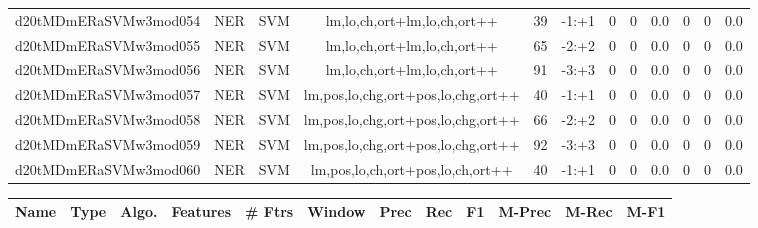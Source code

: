 \documentclass[a4paper]{article}
\begin{document}
\begin{landscape}
\begin{center}
\begin{tabular}{ |c|c|c|c|c|c|c|c|c|c|c|c|}
 
 	
 	\small{ d20tMDmERaSVMw3mod054 } & \small{ NER} & \small{  SVM }  & lm,lo,ch,ort+lm,lo,ch,ort++  &  39 &  \small{  -1:+1 }  &  0 & 0 & 0.0  &  0 & 0 & 0.0 \\
 	

 
 	
 	\small{ d20tMDmERaSVMw3mod055 } & \small{ NER} & \small{  SVM }  & lm,lo,ch,ort+lm,lo,ch,ort++  &  65 &  \small{  -2:+2 }  &  0 & 0 & 0.0  &  0 & 0 & 0.0 \\
 	

 
 	
 	\small{ d20tMDmERaSVMw3mod056 } & \small{ NER} & \small{  SVM }  & lm,lo,ch,ort+lm,lo,ch,ort++  &  91 &  \small{  -3:+3 }  &  0 & 0 & 0.0  &  0 & 0 & 0.0 \\
 	

 
 	
 	\small{ d20tMDmERaSVMw3mod057 } & \small{ NER} & \small{  SVM }  & lm,pos,lo,chg,ort+pos,lo,chg,ort++  &  40 &  \small{  -1:+1 }  &  0 & 0 & 0.0  &  0 & 0 & 0.0 \\
 	

 
 	
 	\small{ d20tMDmERaSVMw3mod058 } & \small{ NER} & \small{  SVM }  & lm,pos,lo,chg,ort+pos,lo,chg,ort++  &  66 &  \small{  -2:+2 }  &  0 & 0 & 0.0  &  0 & 0 & 0.0 \\
 	

 
 	
 	\small{ d20tMDmERaSVMw3mod059 } & \small{ NER} & \small{  SVM }  & lm,pos,lo,chg,ort+pos,lo,chg,ort++  &  92 &  \small{  -3:+3 }  &  0 & 0 & 0.0  &  0 & 0 & 0.0 \\
 	

 
 	
 	\small{ d20tMDmERaSVMw3mod060 } & \small{ NER} & \small{  SVM }  & lm,pos,lo,ch,ort+pos,lo,ch,ort++  &  40 &  \small{  -1:+1 }  &  0 & 0 & 0.0  &  0 & 0 & 0.0 \\
 	
 \hline
\end{tabular}
\end{center}




\begin{center}
\begin{tabular}{ |c|c|c|c|c|c|c|c|c|c|c|c|} 
 \hline
 	Name & Type & Algo. & Features & \# Ftrs & Window & Prec & Rec & F1 & M-Prec & M-Rec & M-F1\\
 \hline

 	

 
 	

\end{tabular}
\end{center}
\end{landscape}
\end{document}
